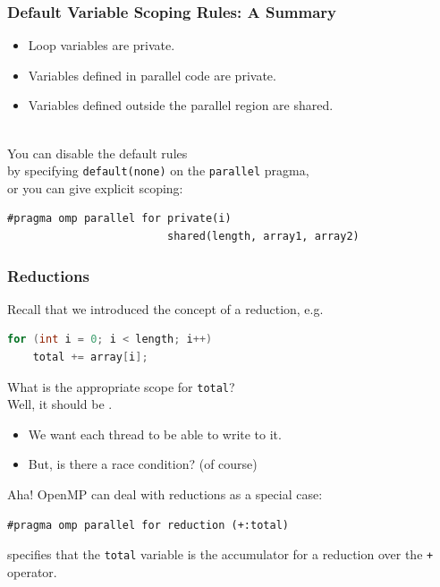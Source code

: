 
\begin{frame}[fragile]
  \frametitle{Default Variable Scoping Rules: A Summary}


\begin{itemize}
  \item Loop variables are private.
  \item Variables defined in parallel code are private.
  \item Variables defined outside the parallel region are shared.
\end{itemize}
~\\

You can disable the default rules \\
by specifying {\tt default(none)} on the {\tt parallel} pragma, \\
or you can give explicit scoping:

\begin{lstlisting}
#pragma omp parallel for private(i) 
                         shared(length, array1, array2)
\end{lstlisting}
  


\end{frame}

\begin{frame}[fragile]
  \frametitle{Reductions}
  
Recall that we introduced the concept of a reduction, e.g.
\begin{lstlisting}[language=C,morekeywords={foreach,pragma,omp,parallel,single,nowait,task,untied,barrier,taskyield}]
for (int i = 0; i < length; i++)
    total += array[i];
\end{lstlisting}

What is the appropriate scope for {\tt total}? \\
\pause
Well, it should be
.

\begin{itemize}
 \item We want each thread to be able to write to it. \pause
 \item But, is there a race condition? (of course)
\end{itemize}

Aha! OpenMP can deal with reductions as a special case:


\begin{lstlisting}
#pragma omp parallel for reduction (+:total)
\end{lstlisting}

specifies that the {\tt total} variable is the accumulator for a
reduction over the {\tt +} operator.
  

\end{frame}


